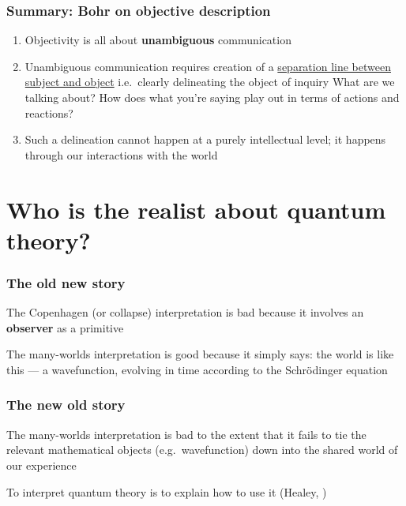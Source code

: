 \documentclass{beamer}
\begin{document}
\begin{frame}
  \frametitle{Summary: Bohr on objective description}

  \begin{enumerate}
  \item Objectivity is all about \textbf{unambiguous} communication
  \item Unambiguous communication requires creation of a
    \underline{separation line between subject and object} \newline
    i.e.\ clearly delineating the object of inquiry \newline What
    are we talking about? How does what you're saying play out in
    terms of actions and reactions?
  \item Such a delineation cannot happen at a purely intellectual
    level; it happens through our interactions with the world
    
  \end{enumerate}


\end{frame}




\section{Who is the realist about quantum theory?}

\begin{frame}
\frametitle{The old new story}
  
The Copenhagen (or collapse) interpretation is bad because it involves
an \textbf{observer} as a primitive

\bigskip The many-worlds interpretation is good because it simply
says: the world is like this --- a wavefunction, evolving in time
according to the Schr{\"o}dinger equation

\end{frame}

\begin{frame}
  \frametitle{The new old story}

  The many-worlds interpretation is bad to the extent that it fails to
  tie the relevant mathematical objects (e.g.\ wavefunction) down into
  the shared world of our experience
  
\bigskip To interpret quantum theory is to explain how to use it
(Healey, )

\end{frame}
\end{document}
